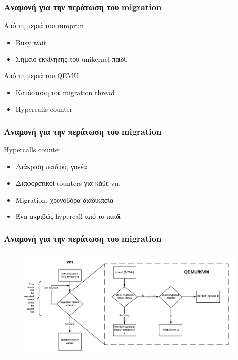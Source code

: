 \documentclass[red,slidestop,notes,compress,mathserif]{beamer}
\begin{document}
\begin{frame}
\frametitle{Αναμονή για την περάτωση του migration}
\begin{block}{Από τη μεριά του rumprun}
\begin{itemize}
\item Busy wait 
\item Σημείο εκκίνησης του unikernel παιδί.
\end{itemize}
\end{block}
\begin{block}{Από τη μεριά του QEMU}
\begin{itemize}
\item Κατάσταση του migration thread
\item Hypercalls counter
\end{itemize}
\end{block}
\end{frame}

\begin{frame}
\frametitle{Αναμονή για την περάτωση του migration}
\begin{block}{Hypercalls counter}
\begin{itemize}
\item Διάκριση παιδιού, γονέα
\item Διαφορετικοί counters για κάθε vm
\item Migration, χρονοβόρα διαδικασία
\item Ένα ακριβώς hypercall από το παιδί
\end{itemize}
\end{block}
\end{frame}

\begin{frame}
\frametitle{Αναμονή για την περάτωση του migration}
\begin{figure}
\center
\includegraphics[scale=0.57]{figures/check_migration_status.png}
\end{figure}
\end{frame}
\end{document}
